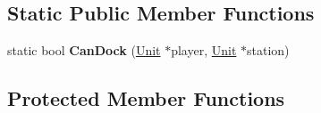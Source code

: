 \subsection*{Static Public Member Functions}
\begin{DoxyCompactItemize}
\item 
static bool {\bfseries Can\+Dock} (\hyperlink{classUnit}{Unit} $\ast$player, \hyperlink{classUnit}{Unit} $\ast$station)\hypertarget{classOrders_1_1AutoDocking_af1a5bbb7d06ea28795b4a071406c7a23}{}\label{classOrders_1_1AutoDocking_af1a5bbb7d06ea28795b4a071406c7a23}

\end{DoxyCompactItemize}
\subsection*{Protected Member Functions}
